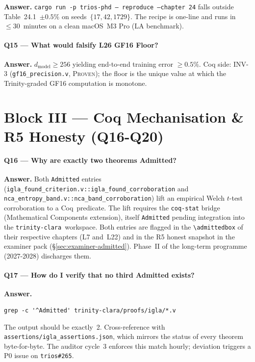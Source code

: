 \textbf{Answer.} \texttt{cargo run -p trios-phd -- reproduce --chapter 24}
falls outside Table~24.1~\(\pm 0.5\%\) on seeds~\(\{17, 42, 1729\}\). The
recipe is one-line and runs in \(\le 30\)~minutes on a clean macOS~M3
Pro (LA benchmark).

\paragraph{Q15 — What would falsify L26 GF16 Floor?}

\textbf{Answer.} \(d_{\mathrm{model}} \ge 256\) yielding end-to-end
training error \(\ge 0.5\%\). Coq side: INV-3
(\texttt{gf16\_precision.v}, \textsc{Proven}); the floor is the unique
value at which the Trinity-graded GF16 computation is monotone.

\section*{Block III — Coq Mechanisation \& R5 Honesty (Q16-Q20)}

\paragraph{Q16 — Why are exactly two theorems Admitted?}

\textbf{Answer.} Both \texttt{Admitted} entries
(\texttt{igla\_found\_criterion.v::igla\_found\_corroboration} and
\texttt{nca\_entropy\_band.v::nca\_band\_corroboration}) lift an empirical
Welch $t$-test corroboration to a Coq~predicate. The lift requires the
\texttt{coq-stat} bridge (Mathematical Components extension), itself
\texttt{Admitted} pending integration into the
\texttt{trinity-clara}~workspace. Both entries are flagged in the
\texttt{\textbackslash admittedbox} of their respective chapters
(L7 and~L22) and in the R5 honest snapshot in the examiner pack
(\S\ref{sec:examiner-admitted}). Phase~II of the long-term programme
(2027-2028) discharges them.

\paragraph{Q17 — How do I verify that no third Admitted exists?}

\textbf{Answer.}
\begin{verbatim}
grep -c '^Admitted' trinity-clara/proofs/igla/*.v
\end{verbatim}
The output should be exactly~2. Cross-reference with
\texttt{assertions/igla\_assertions.json}, which mirrors the status of
every theorem byte-for-byte. The auditor cycle~3 enforces this match
hourly; deviation triggers a P0 issue on \texttt{trios\#265}.

